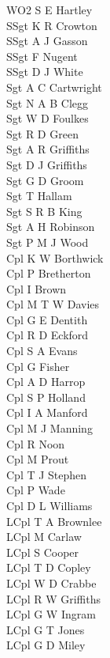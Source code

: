 \begin{multicols}{4}
  \footnotesize
  \noindent
  WO2 S E Hartley \\
  SSgt K R Crowton \\
  SSgt A J Gasson \\
  SSgt F Nugent \\
  SSgt D J White \\
  Sgt A C Cartwright \\
  Sgt N A B Clegg \\
  Sgt W D Foulkes \\
  Sgt R D Green \\
  Sgt A R Griffiths \\
  Sgt D J Griffiths \\
  Sgt G D Groom \\
  Sgt T Hallam \\
  Sgt S R B King \\
  Sgt A H Robinson \\
  Sgt P M J Wood \\
  Cpl K W Borthwick \\
  Cpl P Bretherton \\
  Cpl I Brown \\
  Cpl M T W Davies \\
  Cpl G E Dentith \\
  Cpl R D Eckford \\
  Cpl S A Evans \\
  Cpl G Fisher \\
  Cpl A D Harrop \\
  Cpl S P Holland \\
  Cpl I A Manford \\
  Cpl M J Manning \\
  Cpl R Noon \\
  Cpl M Prout \\
  Cpl T J Stephen \\
  Cpl P Wade \\
  Cpl D L Williams \\
  LCpl T A Brownlee \\
  LCpl M Carlaw \\
  LCpl S Cooper \\
  LCpl T D Copley \\
  LCpl W D Crabbe \\
  LCpl R W Griffiths \\
  LCpl G W Ingram \\
  LCpl G T Jones \\
  LCpl G D Miley \\

\end{multicols}
